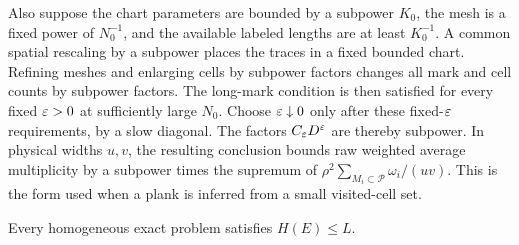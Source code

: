 Also suppose the chart parameters are bounded by a
subpower \(K_0\), the mesh is a fixed power of \(N_0^{-1}\),
and the available labeled lengths are at least \(K_0^{-1}\).
A common spatial rescaling by a subpower places the traces
in a fixed bounded chart.  Refining meshes and enlarging
cells by subpower factors changes all mark and cell
counts by subpower factors.  The long-mark condition is
then satisfied for every fixed \(\varepsilon>0\) at sufficiently
large \(N_0\).  Choose \(\varepsilon\downarrow0\) only after these
fixed-\(\varepsilon\) requirements, by a slow diagonal.
The factors \(C_\varepsilon D^\varepsilon\) are thereby subpower.
In physical widths \(u,v\), the resulting conclusion
bounds raw weighted average multiplicity by a subpower
times the supremum of
\(\rho^2\sum_{M_i\subset\mathcal P}\omega_i/(uv)\).
This is the form used when a plank is inferred from a
small visited-cell set.

\begin{proposition}\label{a01:horizon-bound}
Every homogeneous exact problem satisfies \(H(E)\le L\).
\end{proposition}

